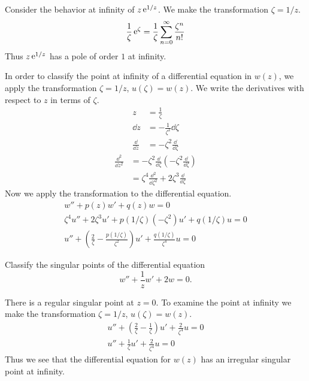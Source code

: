 \begin{Example}
  Consider the behavior at infinity of $z \mathop{\mathrm{e}}\nolimits^{1/z}$.  We make the transformation
  $\zeta = 1/z$.
  \[ 
  \frac{1}{\zeta} \mathop{\mathrm{e}}\nolimits^\zeta = \frac{1}{\zeta} \sum_{n=0}^\infty \frac{\zeta^n}{n!}
  \]
  Thus $z \mathop{\mathrm{e}}\nolimits^{1/z}$ has a pole of order $1$ at infinity.
\end{Example}






In order to classify the point at infinity of a differential equation
in $w(z)$, we apply the transformation $\zeta = 1/z$, $u(\zeta) = w(z)$.
We write the derivatives with respect to $z$ in terms of $\zeta$.
\begin{align*}
  z &= \frac{1}{\zeta} 
  \\
  \dd z &= - \frac{1}{\zeta^2} \dd \zeta 
  \\
  \frac{\dd}{\dd z} &= - \zeta^2 \frac{\dd}{\dd \zeta}
\end{align*}
\begin{align*}
  \frac{\dd^2}{\dd z^2} &= -\zeta^2 \frac{\dd}{\dd \zeta} \left( - \zeta^2 \frac{\dd}{\dd \zeta} 
  \right) 
  \\
  &= \zeta^4 \frac{\dd^2}{\dd \zeta^2} + 2 \zeta^3 \frac{\dd}{\dd \zeta}
\end{align*}
Now we apply the transformation to the differential equation.
\begin{gather*}
  w'' + p(z) w' + q(z) w = 0
  \\
  \zeta^4 u'' + 2 \zeta^3 u' + p(1/\zeta) (-\zeta^2) u' + q(1/\zeta) u = 0 
  \\
  u'' + \left( \frac{2}{\zeta} - \frac{p(1/\zeta)}{\zeta^2} \right) u'
  + \frac{q(1/\zeta)}{\zeta^4} u = 0
\end{gather*}





\begin{Example}
  Classify the singular points of the differential equation
  \[ 
  w'' + \frac{1}{z} w' + 2 w = 0. 
  \]

  There is a regular singular point at $z = 0$.  To examine the point 
  at infinity
  we make the transformation $\zeta = 1/z$, $u(\zeta) = w(z)$.
  \begin{gather*}
    u'' + \left( \frac{2}{\zeta} - \frac{1}{\zeta} \right) u' + \frac{2}{\zeta^4} u = 0 
    \\
    u'' + \frac{1}{\zeta}  u' + \frac{2}{\zeta^4} u = 0
  \end{gather*}
  Thus we see that the differential equation for $w(z)$ has an irregular 
  singular point at infinity.
\end{Example}






























